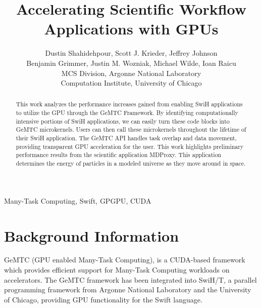 \documentclass[conference]{IEEEtran}
\begin{document}
%
\title{Accelerating Scientific Workflow Applications with GPUs}


\author{Dustin Shahidehpour,
Scott J. Krieder,
Jeffrey Johnson\\
Benjamin Grimmer,
Justin M. Wozniak,
Michael Wilde,
Ioan Raicu\\
MCS Division, Argonne National Laboratory\\
Computation Institute, University of Chicago
}


\maketitle


\begin{abstract}
This work analyzes the performance increases gained from enabling SwiH applications to utilize the GPU through the GeMTC Framework. By identifying computationally intensive portions of SwiH applications, we can easily turn these code blocks into GeMTC microkernels. Users can then call these microkernels throughout the lifetime of their SwiH application. The GeMTC API handles task overlap and data movement, providing transparent GPU acceleration for the user. This work highlights preliminary performance results from the scientific application MDProxy. This application determines the energy of particles in a modeled universe as they move around in space.
\end{abstract}

\begin{IEEEkeywords}
Many-Task Computing, Swift, GPGPU, CUDA
\end{IEEEkeywords}

\IEEEpeerreviewmaketitle

\section{Background Information}
GeMTC (GPU enabled Many-Task Computing), is a CUDA-based framework which provides eﬃcient support for Many-Task Computing workloads on accelerators. The GeMTC framework has been integrated into SwiH/T, a parallel programming framework from Argonne National Laboratory and the University of Chicago, providing GPU functionality for the Swift language.
\end{document}
